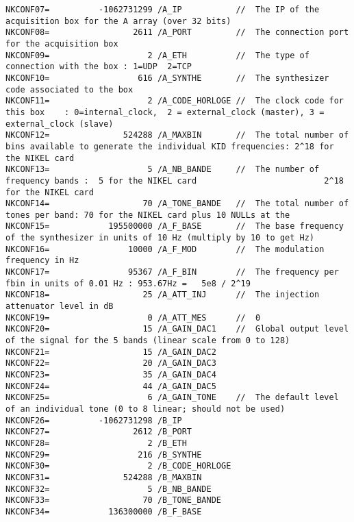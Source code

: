 \documentclass[a4paper,10pt]{article}
\begin{document}
\begin{verbatim}
NKCONF07=          -1062731299 /A_IP           //  The IP of the acquisition box for the A array (over 32 bits)                       
NKCONF08=                 2611 /A_PORT         //  The connection port for the acquisition box                                   
NKCONF09=                    2 /A_ETH          //  The type of connection with the box : 1=UDP  2=TCP                            
NKCONF10=                  616 /A_SYNTHE       //  The synthesizer code associated to the box                                    
NKCONF11=                    2 /A_CODE_HORLOGE //  The clock code for this box    : 0=internal_clock,  2 = external_clock (master), 3 = external_clock (slave)                                               
NKCONF12=               524288 /A_MAXBIN       //  The total number of bins available to generate the individual KID frequencies: 2^18 for the NIKEL card
NKCONF13=                    5 /A_NB_BANDE     //  The number of frequency bands :  5 for the NIKEL card                          2^18 for the NIKEL card
NKCONF14=                   70 /A_TONE_BANDE   //  The total number of tones per band: 70 for the NIKEL card plus 10 NULLs at the
NKCONF15=            195500000 /A_F_BASE       //  The base frequency of the synthesizer in units of 10 Hz (multiply by 10 to get Hz)
NKCONF16=                10000 /A_F_MOD        //  The modulation frequency in Hz                                                
NKCONF17=                95367 /A_F_BIN        //  The frequency per fbin in units of 0.01 Hz : 953.67Hz =   5e8 / 2^19          
NKCONF18=                   25 /A_ATT_INJ      //  The injection attenuator level in dB                                          
NKCONF19=                    0 /A_ATT_MES      //  0                                                                             
NKCONF20=                   15 /A_GAIN_DAC1    //  Global output level of the signal for the 5 bands (linear scale from 0 to 128)
NKCONF21=                   15 /A_GAIN_DAC2    
NKCONF22=                   20 /A_GAIN_DAC3
NKCONF23=                   35 /A_GAIN_DAC4
NKCONF24=                   44 /A_GAIN_DAC5
NKCONF25=                    6 /A_GAIN_TONE    //  The default level of an individual tone (0 to 8 linear; should not be used)
NKCONF26=          -1062731298 /B_IP
NKCONF27=                 2612 /B_PORT
NKCONF28=                    2 /B_ETH
NKCONF29=                  216 /B_SYNTHE
NKCONF30=                    2 /B_CODE_HORLOGE
NKCONF31=               524288 /B_MAXBIN
NKCONF32=                    5 /B_NB_BANDE
NKCONF33=                   70 /B_TONE_BANDE
NKCONF34=            136300000 /B_F_BASE

\end{verbatim}
\end{document}
